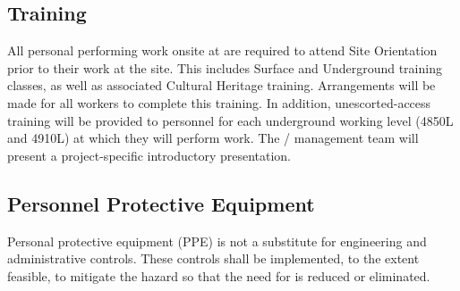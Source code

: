 \subsection{ Training}


All personal performing work onsite at  are required to
attend   Site Orientation prior to their work
at the site.  This includes  Surface and Underground
training classes, as well as associated Cultural Heritage
training. Arrangements will be made for all workers to complete this
training. In addition, unescorted-access training will be provided to
personnel for each underground working level (4850L and 4910L) at
which they will perform work.  The /
 management team will present a project-specific
introductory  presentation.

\subsection{Personnel Protective Equipment}

Personal protective equipment (PPE) is not a substitute for
engineering and administrative controls. These controls shall be
implemented, to the extent feasible, to mitigate the hazard so that
the need for  is reduced or eliminated.


